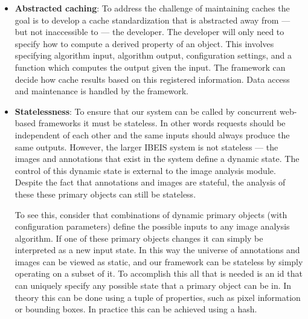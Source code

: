     \begin{itemize}

        \item \textbf{Abstracted caching}:
            To address the challenge of maintaining caches the goal is to
              develop a cache standardization that is abstracted away from ---
              but not inaccessible to --- the developer.
            The developer will only need to specify how to compute a derived
              property of an object.
            This involves specifying algorithm input, algorithm output,
              configuration settings, and a function which computes the output
              given the input.
            The framework can decide how cache results based on this
              registered information.
            Data access and maintenance is handled by the framework.

        \item \textbf{Statelessness}:
            To ensure that our system can be called by concurrent web-based
              frameworks it must be stateless.
            In other words requests should be independent of each other and
              the same inputs should always produce the same outputs.
            However, the larger IBEIS system is not stateless --- the images
              and annotations that exist in the system define a dynamic state.
            The control of this dynamic state is external to the image
              analysis module.
            Despite the fact that annotations and images are stateful, the
              analysis of these these primary objects can still be stateless.

            To see this, consider that combinations of dynamic primary objects
              (with configuration parameters) define the possible inputs to any
              image analysis algorithm.
            If one of these primary objects changes it can simply be
              interpreted as a new input state.
            In this way the universe of annotations and images can be viewed
              as static, and our framework can be stateless by simply operating
              on a subset of it.
            To accomplish this all that is needed is an id that can uniquely
              specify any possible state that a primary object can be in.
            In theory this can be done using a tuple of properties, such as
              pixel information or bounding boxes.
            In practice this can be achieved using a hash.


\end{itemize}
